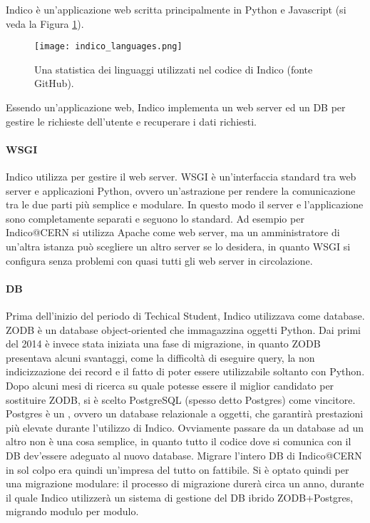 		Indico è un'applicazione web scritta principalmente in Python e Javascript (si veda la Figura \ref{fig:indico_languages}).
		
		\begin{figure}[h!]
			\begin{center}
				\texttt{[image: indico\_languages.png]}
			\end{center}
			\caption[Linguaggi di Indico]{Una statistica dei linguaggi utilizzati nel codice di Indico (fonte GitHub).}
			\label{fig:indico_languages}
		\end{figure}
		
		Essendo un'applicazione web, Indico implementa un web server ed un \ac{DB} per gestire le richieste dell'utente e recuperare i dati richiesti.
		
		\paragraph{WSGI}Indico utilizza  per gestire il web server. \ac{WSGI} è un'interfaccia standard tra web server e applicazioni Python, ovvero un'astrazione per rendere la comunicazione tra le due parti più semplice e modulare. In questo modo il server e  l'applicazione sono completamente separati e seguono lo standard. Ad esempio per Indico@CERN si utilizza Apache come web server, ma un amministratore di un'altra istanza può scegliere un altro server se lo desidera, in quanto \ac{WSGI} si configura senza problemi con quasi tutti gli web server in circolazione. \cite{indico:wsgi}
		
		\paragraph{DB}Prima dell'inizio del periodo di Techical Student, Indico utilizzava  come database. \ac{ZODB} è un database object-oriented che immagazzina oggetti Python. Dai primi del 2014 è invece stata iniziata una fase di migrazione, in  quanto \ac{ZODB} presentava alcuni svantaggi, come la difficoltà di eseguire query, la non indicizzazione dei record e il fatto di poter essere utilizzabile soltanto con Python. Dopo alcuni mesi di ricerca su quale potesse essere il miglior candidato per sostituire \ac{ZODB}, si è scelto PostgreSQL (spesso detto Postgres) come vincitore. Postgres è un , ovvero un database relazionale a oggetti, che garantirà prestazioni più elevate durante l'utilizzo di Indico. Ovviamente passare da un database ad un altro non è una cosa semplice, in quanto tutto il codice dove si comunica con il \ac{DB} dev'essere adeguato al nuovo database. Migrare l'intero \ac{DB} di Indico@CERN in sol colpo era quindi un'impresa del tutto on fattibile. Si è optato quindi per una migrazione modulare: il processo di migrazione durerà circa un anno, durante il quale Indico utilizzerà un sistema di gestione del \ac{DB} ibrido \ac{ZODB}+Postgres, migrando modulo per modulo. \cite{indico:zodb}\cite{pedro:chep}
		
